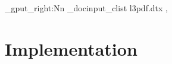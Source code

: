 \documentclass{l3doc}
\begin{document}
\makeatletter
\let\DelayPrintIndex\PrintIndex
\let\PrintIndex\@empty
\makeatother

\ExplSyntaxOn
\clist_gput_right:Nn \g_docinput_clist
  {
    l3pdf.dtx ,
  }
\ExplSyntaxOff

\part{Implementation}

\def\maketitle{}
\EnableImplementation
\DisableDocumentation
\DocInputAgain

\clearpage

\DelayPrintIndex
\end{document}
